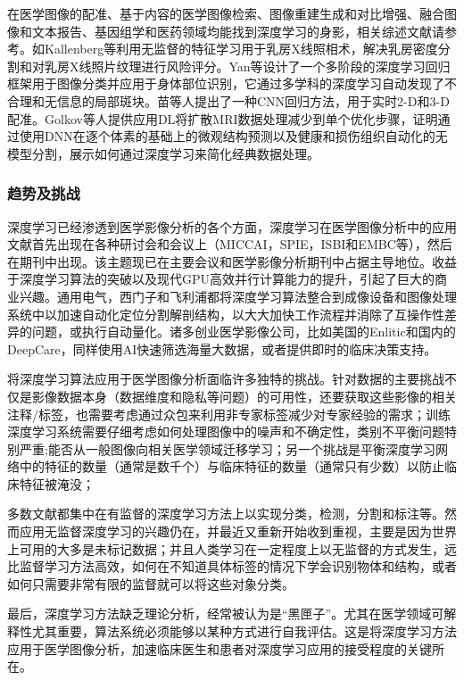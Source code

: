 在医学图像的配准、基于内容的医学图像检索、图像重建生成和对比增强、融合图像和文本报告、基因组学和医药领域均能找到深度学习的身影，相关综述文献请参考。如Kallenberg等\citep{Kallenberg2016Unsupervised}利用无监督的特征学习用于乳房X线照相术，解决乳房密度分割和对乳房X线照片纹理进行风险评分。Yan等\citep{Yan2016Multi}设计了一个多阶段的深度学习回归框架用于图像分类并应用于身体部位识别，它通过多学科的深度学习自动发现了不合理和无信息的局部斑块。苗等人\citep{Miao2016A}提出了一种CNN回归方法，用于实时2-D和3-D配准。Golkov等人\citep{Golkov2016q}提供应用DL将扩散MRI数据处理减少到单个优化步骤，证明通过使用DNN在逐个体素的基础上的微观结构预测以及健康和损伤组织自动化的无模型分割，展示如何通过深度学习来简化经典数据处理。

\subsubsection{趋势及挑战}

深度学习已经渗透到医学影像分析的各个方面，深度学习在医学图像分析中的应用文献首先出现在各种研讨会和会议上（MICCAI，SPIE，ISBI和EMBC等），然后在期刊中出现。该主题现已在主要会议和医学影像分析期刊中占据主导地位。收益于深度学习算法的突破以及现代GPU高效并行计算能力的提升，引起了巨大的商业兴趣。通用电气，西门子和飞利浦都将深度学习算法整合到成像设备和图像处理系统中以加速自动化定位分割解剖结构，以大大加快工作流程并消除了互操作性差异的问题，或执行自动量化。诸多创业医学影像公司，比如美国的Enlitic和国内的DeepCare，同样使用AI快速筛选海量大数据，或者提供即时的临床决策支持。

将深度学习算法应用于医学图像分析面临许多独特的挑战。针对数据的主要挑战不仅是影像数据本身（数据维度和隐私等问题）的可用性，还要获取这些影像的相关注释/标签，也需要考虑通过众包来利用非专家标签减少对专家经验的需求；训练深度学习系统需要仔细考虑如何处理图像中的噪声和不确定性，类别不平衡问题特别严重;能否从一般图像向相关医学领域迁移学习；另一个挑战是平衡深度学习网络中的特征的数量（通常是数千个）与临床特征的数量（通常只有少数）以防止临床特征被淹没； 

多数文献都集中在有监督的深度学习方法上以实现分类，检测，分割和标注等。然而应用无监督深度学习的兴趣仍在，并最近又重新开始收到重视，主要是因为世界上可用的大多是未标记数据；并且人类学习在一定程度上以无监督的方式发生，远比监督学习方法高效，如何在不知道具体标签的情况下学会识别物体和结构，或者如何只需要非常有限的监督就可以将这些对象分类。

最后，深度学习方法缺乏理论分析，经常被认为是“黑匣子”。尤其在医学领域可解释性尤其重要，算法系统必须能够以某种方式进行自我评估。这是将深度学习方法应用于医学图像分析，加速临床医生和患者对深度学习应用的接受程度的关键所在。

